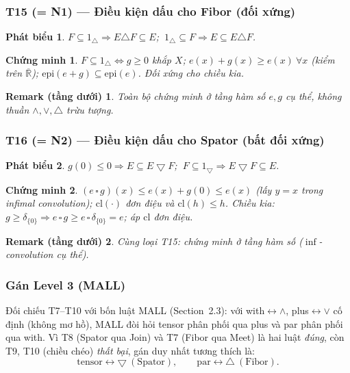 \documentclass[11pt]{article}
\theoremstyle{plainlabel}
\newtheorem*{phatbieu}{Phát biểu}
\newtheorem*{chungminh}{Chứng minh}
\newtheorem*{remarkbox}{Remark (tầng dưới)}
\begin{document}
\subsubsection*{T15 (= N1) --- Điều kiện dấu cho Fibor (đối xứng)}
\begin{phatbieu} $F\subseteq1_\triangle\Rightarrow E\triangle F\subseteq E$; $\ 1_\triangle\subseteq F\Rightarrow E\subseteq E\triangle F$. \end{phatbieu}
\begin{chungminh} $F\subseteq1_\triangle\iff g\ge0$ khắp $X$; $e(x)+g(x)\ge e(x)\ \forall x$ (kiểm trên $\overline{\mathbb R}$); $\mathrm{epi}(e+g)\subseteq\mathrm{epi}(e)$. Đối xứng cho chiều kia. \end{chungminh}
\begin{remarkbox} Toàn bộ chứng minh ở tầng hàm số $e,g$ cụ thể, không thuần $\wedge,\vee,\triangle$ trừu tượng. \end{remarkbox}

\subsubsection*{T16 (= N2) --- Điều kiện dấu cho Spator (bất đối xứng)}
\begin{phatbieu} $g(0)\le0\Rightarrow E\subseteq E\bigtriangledown F$; $\ F\subseteq1_{\bigtriangledown}\Rightarrow E\bigtriangledown F\subseteq E$. \end{phatbieu}
\begin{chungminh} $(e\,\square\,g)(x)\le e(x)+g(0)\le e(x)$ (lấy $y=x$ trong infimal convolution); $\mathrm{cl}(\cdot)$ đơn điệu và $\mathrm{cl}(h)\le h$. Chiều kia: $g\ge\delta_{\{0\}}\Rightarrow e\,\square\,g\ge e\,\square\,\delta_{\{0\}}=e$; áp $\mathrm{cl}$ đơn điệu. \end{chungminh}
\begin{remarkbox} Cùng loại T15: chứng minh ở tầng hàm số ($\inf$-convolution cụ thể). \end{remarkbox}

\subsubsection*{Gán Level 3 (MALL)}

Đối chiếu T7--T10 với bốn luật MALL (Section~2.3): với with$\leftrightarrow\wedge$, plus$\leftrightarrow\vee$ cố định (không mơ hồ), MALL đòi hỏi tensor phân phối qua plus và par phân phối qua with. Vì T8 (Spator qua Join) và T7 (Fibor qua Meet) là hai luật \emph{đúng}, còn T9, T10 (chiều chéo) \emph{thất bại}, gán duy nhất tương thích là:
\[
\boxed{\text{tensor}\leftrightarrow\bigtriangledown\ (\text{Spator}), \qquad \text{par}\leftrightarrow\triangle\ (\text{Fibor}).}
\]
\end{document}
